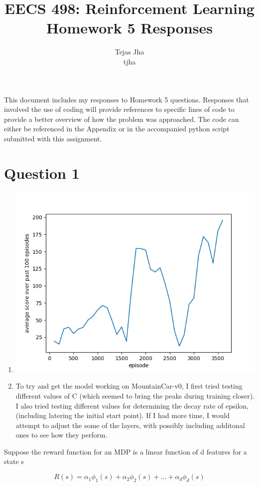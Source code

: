 \documentclass[11pt]{article}
\title{EECS 498: Reinforcement Learning \protect \\ Homework 5 Responses}
\author{Tejas Jha \\ tjha}
\begin{document}
\maketitle
This document includes my responses to Homework 5 questions. Responses that involved the use of coding will provide references to specific lines of code to provide a better overview of how the problem was approached. The code can either be referenced in the Appendix or in the accompanied python script submitted with this assignment.

\section*{Question 1}
\begin{enumerate}[label=(\alph*)]
\item

\includegraphics[scale=1]{testPole.png}

\item
To try and get the model working on MountainCar-v0, I first tried testing different values of C (which seemed to bring the peaks during training closer). I also tried testing different values for determining the decay rate of epsilon, (including latering the initial start point). If I had more time, I would attempt to adjust the some of the layers, with possibly including additonal ones to see how they perform.

\end{enumerate}
Suppose the reward function for an MDP is a linear function of d features for a state s

$$R(s) = \alpha_{1}\phi_{1}(s) + \alpha_{2}\phi_{2}(s) + ... +  \alpha_{d}\phi_{d}(s)$$
\end{document}
